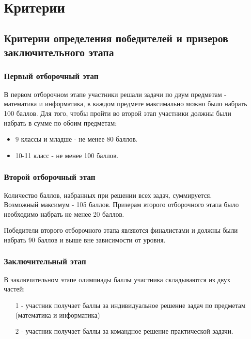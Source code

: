 \part{Критерии}
\chapter{Критерии определения победителей и призеров заключительного этапа}
 
\section{Первый отборочный этап}
 
В первом отборочном этапе участники решали задачи по двум предметам - математика и информатика, в каждом предмете максимально можно было набрать 100 баллов. Для того, чтобы пройти во второй этап участники должны были набрать в сумме по обоим предметам:
\begin{itemize}
    \item 9 классы и младше - не менее 80 баллов.
    \item 10-11 класс - не менее 100 баллов.
\end{itemize}

\section{Второй отборочный этап}

Количество баллов, набранных при решении всех задач, суммируется. Возможный максимум - 105 баллов. Призерам второго отборочного этапа было необходимо набрать не менее 20 баллов.

Победители второго отборочного этапа являются финалистами и должны были набрать 90 баллов и выше вне зависимости от уровня.

\section{Заключительный этап}

В заключительном этапе олимпиады баллы участника складываются из двух частей: 
\begin{enumerate}
    \item[1 -] участник получает баллы за индивидуальное решение задач по предметам (математика и информатика)
    \item[2 -] участник получает баллы за командное решение практической задачи.
\end{enumerate} 

